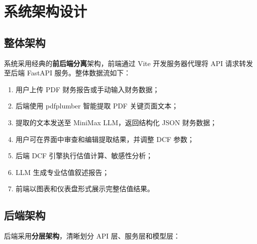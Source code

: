 \documentclass[12pt,a4paper]{article}
\begin{document}
\section{系统架构设计}

\subsection{整体架构}

系统采用经典的\textbf{前后端分离}架构，前端通过 Vite 开发服务器代理将 API 请求转发至后端 FastAPI 服务。整体数据流如下：

\begin{keybox}[系统数据流]
\begin{enumerate}[leftmargin=2em]
  \item 用户上传 PDF 财务报告或手动输入财务数据；
  \item 后端使用 pdfplumber 智能提取 PDF 关键页面文本；
  \item 提取的文本发送至 MiniMax LLM，返回结构化 JSON 财务数据；
  \item 用户可在界面中审查和编辑提取结果，并调整 DCF 参数；
  \item 后端 DCF 引擎执行估值计算、敏感性分析；
  \item LLM 生成专业估值叙述报告；
  \item 前端以图表和仪表盘形式展示完整估值结果。
\end{enumerate}
\end{keybox}

\subsection{后端架构}

后端采用\textbf{分层架构}，清晰划分 API 层、服务层和模型层：
\end{document}
